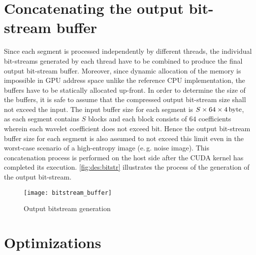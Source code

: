\section{Concatenating the output bit-stream buffer}\label{sec:concat}
Since each segment is processed independently by different threads, the individual bit-streams generated by each thread have to be combined to produce the final output bit-stream buffer. Moreover, since dynamic allocation of the memory is impossible in \gls{GPU} address space unlike the reference \gls{CPU} implementation, the buffers have to be statically allocated up-front. In order to determine the size of the buffers, it is safe to assume that the compressed output bit-stream size shall not exceed the input. The input buffer size for each segment is $\unit[S\times 64\times 4]{byte}$, as each segment contains $S$ blocks and each block consists of $64$ coefficients wherein each wavelet coefficient does not exceed \unit[20]{bit}. Hence the output bit-stream buffer size for each segment is also assumed to not exceed this limit even in the worst-case scenario of a high-entropy image (e.\,g. noise image). This concatenation process is performed on the host side after the CUDA kernel has completed its execution. \autoref{fig:des:bitstr} illustrates the process of the generation of the output bit-stream.
\begin{figure}[tb]
  \centering
  \texttt{[image: bitstream\_buffer]}
  \caption{Output bitstream generation}
  \label{fig:des:bitstr}
\end{figure}

\section{Optimizations}

